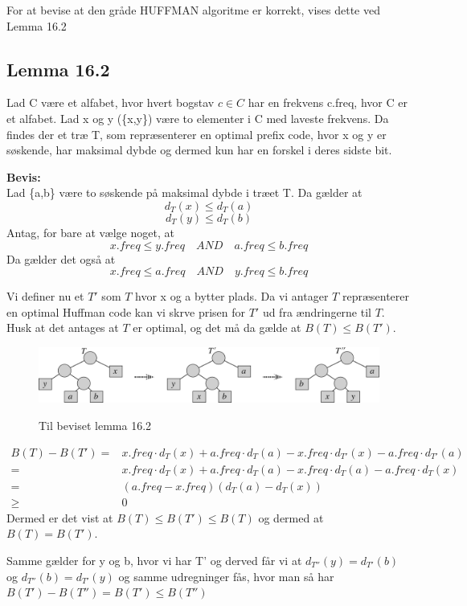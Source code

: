 \documentclass[11pt,a4paper]{report}
\theoremstyle{plain}
\theoremstyle{definition}
\theoremstyle{remark}
\numberwithin{equation}{section}
\begin{document}
For at bevise at den gråde HUFFMAN algoritme er korrekt, vises dette ved Lemma 16.2

\subsection{Lemma 16.2}
Lad C være et alfabet, hvor hvert bogstav $c \in C$  har en frekvens c.freq, hvor C er et alfabet. Lad x og y (\{x,y\}) være to elementer i C med laveste frekvens. Da findes der et træ T, som repræsenterer en optimal prefix code, hvor x og y er søskende, har maksimal dybde og dermed kun har en forskel i deres sidste bit.

\textbf{Bevis:}\\
Lad \{a,b\} være to søskende på maksimal dybde i træet T. Da gælder at
\[
d_T(x) \leq d_T(a)
\]
\[
d_T(y) \leq d_T(b)
\]
Antag, for bare at vælge noget, at
\[
x.freq \leq y.freq \quad AND \quad a.freq \leq b.freq
\]
Da gælder det også at
\[
x.freq \leq a.freq \quad AND \quad y.freq \leq b.freq
\]

Vi definer nu et $T'$ som $T$ hvor x og a bytter plads. Da vi antager $T$ repræsenterer en optimal Huffman code kan vi skrve prisen for $T'$ ud fra ændringerne til $T$.
Husk at det antages at $T$ er optimal, og det må da gælde at $B(T) \leq B(T')$.

\begin{figure}[H]
  \centering
  \includegraphics[scale=0.06]{lemma163.jpg}\\
  \caption{Til beviset lemma 16.2}
\end{figure}

\begin{align*}
  B(T) - B(T') =&  x.freq \cdot d_T(x) + a.freq \cdot d_T(a) - x.freq \cdot d_{T'}(x) - a.freq \cdot d_{T'}(a) \\
   =& x.freq \cdot d_T(x) + a.freq \cdot d_T(a) - x.freq \cdot d_T(a) - a.freq \cdot d_T(x) \\
   =& (a.freq - x.freq)(d_T(a) - d_T(x))\\
   \geq& 0
\end{align*}
Dermed er det vist at $B(T) \leq B(T') \leq B(T)$ og dermed at $B(T) = B(T')$.

Samme gælder for y og b, hvor vi har T' og derved får vi at $d_{T''}(y) = d_{T'}(b)$ og $d_{T''}(b) = d_{T'}(y)$ og samme udregninger fås, hvor man så har $B(T') - B(T'') = B(T') \leq B(T'')$
\end{document}
